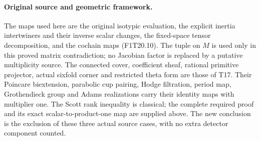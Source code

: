 \paragraph{Original source and geometric framework.}
The maps used here are the original isotypic evaluation,
the explicit inertia intertwiners and their inverse scalar
changes, the fixed-space tensor decomposition, and the
cochain maps (F1T20.10). The tuple on \(M\) is used
only in this proved matrix contradiction; no Jacobian
factor is replaced by a putative multiplicity source.
The connected cover, coefficient sheaf, rational primitive
projector, actual sixfold corner and restricted theta
form are those of T17. Their Poincare biextension,
parabolic cup pairing, Hodge filtration, period map,
Grothendieck group and Adams realizations carry their
identity maps with multiplier one. The Scott rank
inequality is classical; the complete required proof
and its exact scalar-to-product-one map are supplied
above. The new conclusion is the exclusion of these
three actual source cases, with no extra detector
component counted.

